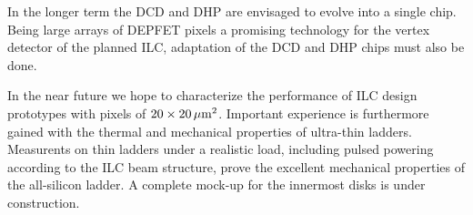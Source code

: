 In the longer term the DCD and DHP are envisaged to evolve into a single chip. Being large arrays of DEPFET pixels a promising technology for the vertex detector of the planned ILC, adaptation of the DCD and DHP chips must also be done.

 In the near future we hope to characterize the performance of ILC design prototypes with pixels of $20 \times \unit[20]{\micron^2}$.
Important experience is furthermore gained with the thermal and mechanical properties of ultra-thin ladders. Measurents on thin ladders under a realistic load, including pulsed powering according to the ILC beam structure, prove the excellent mechanical properties of the all-silicon ladder. A complete mock-up for the innermost disks is under construction.
